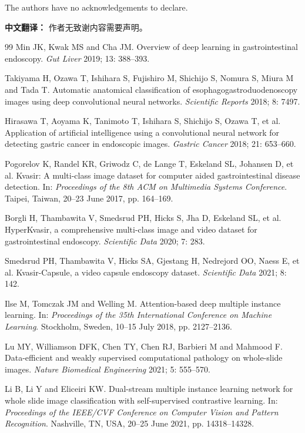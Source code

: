 \documentclass[Afour,sagev,times]{sagej}
\begin{document}
\begin{acks}
The authors have no acknowledgements to declare.
\end{acks}

\textbf{中文翻译：} 作者无致谢内容需要声明。





\begin{thebibliography}{99}
Min JK, Kwak MS and Cha JM. Overview of deep learning in gastrointestinal endoscopy. \textit{Gut Liver} 2019; 13: 388--393.

Takiyama H, Ozawa T, Ishihara S, Fujishiro M, Shichijo S, Nomura S, Miura M and Tada T. Automatic anatomical classification of esophagogastroduodenoscopy images using deep convolutional neural networks. \textit{Scientific Reports} 2018; 8: 7497.

Hirasawa T, Aoyama K, Tanimoto T, Ishihara S, Shichijo S, Ozawa T, et al. Application of artificial intelligence using a convolutional neural network for detecting gastric cancer in endoscopic images. \textit{Gastric Cancer} 2018; 21: 653--660.

Pogorelov K, Randel KR, Griwodz C, de Lange T, Eskeland SL, Johansen D, et al. Kvasir: A multi-class image dataset for computer aided gastrointestinal disease detection. In: \textit{Proceedings of the 8th ACM on Multimedia Systems Conference}. Taipei, Taiwan, 20--23 June 2017, pp. 164--169.

Borgli H, Thambawita V, Smedsrud PH, Hicks S, Jha D, Eskeland SL, et al. HyperKvasir, a comprehensive multi-class image and video dataset for gastrointestinal endoscopy. \textit{Scientific Data} 2020; 7: 283.

Smedsrud PH, Thambawita V, Hicks SA, Gjestang H, Nedrejord OO, Naess E, et al. Kvasir-Capsule, a video capsule endoscopy dataset. \textit{Scientific Data} 2021; 8: 142.

Ilse M, Tomczak JM and Welling M. Attention-based deep multiple instance learning. In: \textit{Proceedings of the 35th International Conference on Machine Learning}. Stockholm, Sweden, 10--15 July 2018, pp. 2127--2136.

Lu MY, Williamson DFK, Chen TY, Chen RJ, Barbieri M and Mahmood F. Data-efficient and weakly supervised computational pathology on whole-slide images. \textit{Nature Biomedical Engineering} 2021; 5: 555--570.

Li B, Li Y and Eliceiri KW. Dual-stream multiple instance learning network for whole slide image classification with self-supervised contrastive learning. In: \textit{Proceedings of the IEEE/CVF Conference on Computer Vision and Pattern Recognition}. Nashville, TN, USA, 20--25 June 2021, pp. 14318--14328.


\end{thebibliography}
\end{document}
